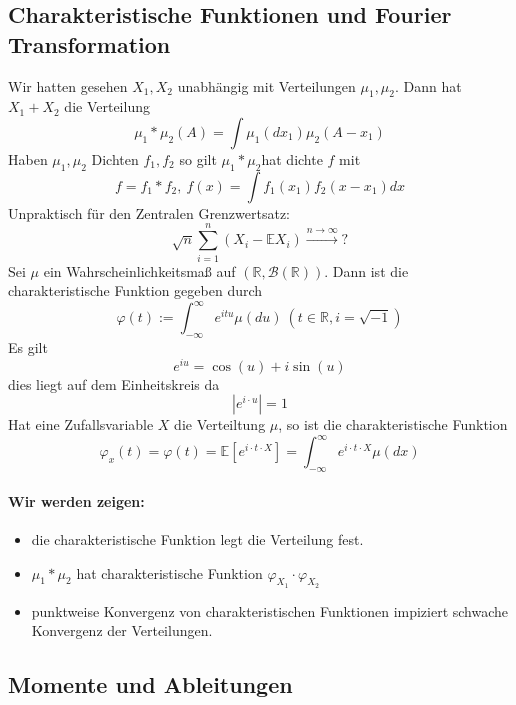 \documentclass[10pt,a4paper]{report}
\numberwithin{equation}{section}
\numberwithin{figure}{section}
\theoremstyle{plain}
\theoremstyle{definition}
\theoremstyle{remark}
\theoremstyle{plain}
\newcommand{\1}{ \mathbb{1} } %
\begin{document}

\subsection*{Charakteristische Funktionen und Fourier Transformation}

 Wir hatten gesehen $X_{1},X_{2}$
unabhängig mit Verteilungen $\mu_{1},\mu_{2}$. Dann hat $X_{1}+X_{2}$
die Verteilung
\[
\mu_{1}*\mu_{2}\left(A\right)=\int\mu_{1}\left(dx_{1}\right)\mu_{2}\left(A-x_{1}\right)
\]
Haben $\mu_{1},\mu_{2}$ Dichten $f_{1},f_{2}$ so gilt $\mu_{1}*\mu_{2}$hat
dichte $f$ mit 
\[
f=f_{1}*f_{2},\ f\left(x\right)=\int f_{1}\left(x_{1}\right)f_{2}\left(x-x_{1}\right)dx
\]
Unpraktisch für den Zentralen Grenzwertsatz:
\[
\sqrt{n}\sum_{i=1}^{n}\left(X_{i}-\mathbb{E}X_{i}\right)\overset{n\to\infty}{\longrightarrow}?
\]
Sei $\mu$ ein Wahrscheinlichkeitsmaß auf $\left(\mathbb{R},\mathcal{B}\left(\mathbb{R}\right)\right)$.
Dann ist die charakteristische Funktion gegeben durch 
\[
\varphi\left(t\right):=\int_{-\infty}^{\infty}e^{itu}\mu\left(du\right)\ \left(t\in\mathbb{R},i=\sqrt{-1}\right)
\]
Es gilt 
\[
e^{iu}=\cos\left(u\right)+i\sin\left(u\right)
\]
dies liegt auf dem Einheitskreis da
\[
\left|e^{i\cdot u}\right|=1
\]
Hat eine Zufallsvariable $X$ die Verteiltung $\mu$, so ist die charakteristische
Funktion
\[
\varphi_{x}\left(t\right)=\varphi\left(t\right)=\mathbb{E}\left[e^{i\cdot t\cdot X}\right]=\int_{-\infty}^{\infty}e^{i\cdot t\cdot X}\mu\left(dx\right)
\]



\paragraph*{Wir werden zeigen:}
\begin{itemize}
\item die charakteristische Funktion legt die Verteilung fest.
\item $\mu_{1}*\mu_{2}$ hat charakteristische Funktion $\varphi_{X_{1}}\cdot\varphi_{X_{2}}$
\item punktweise Konvergenz von charakteristischen Funktionen impiziert
  schwache Konvergenz der Verteilungen.
\end{itemize}

\subsection*{Momente und Ableitungen}
\end{document}
